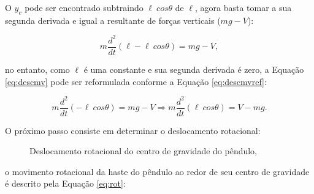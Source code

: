 \documentclass[12pt,           %
a4paper,                       %
openany,                       %
oneside,                       %
chapter=TITLE,                 %
english,                       %
spanish,                       %
brazil,                        %
sumario=tradicional]{abntex2}  %
\begin{document}
\begin{OnehalfSpace}
O $y_c$ pode ser encontrado subtraindo $\ell\:cos\theta$ de $\ell$, agora basta tomar a sua segunda derivada e igual a resultante de forças verticais ($mg-V$):

\begin{equation}
    m\frac{d^2}{dt}(\ell-\ell\:cos\theta) = mg - V,
    \label{eq:descmv}
\end{equation}

\noindent no entanto, como $\ell$ é uma constante e sua segunda derivada é zero, a Equação \ref{eq:descmv} pode ser reformulada conforme a Equação \ref{eq:descmvref}:

\begin{equation}
    m\frac{d^2}{dt}(-\ell\:cos\theta) = mg - V \Longrightarrow  m\frac{d^2}{dt}(\ell\:cos\theta) = V-mg.
    \label{eq:descmvref}
\end{equation}

O próximo passo consiste em determinar o deslocamento rotacional:

\begin{figure}[H]
    \centering
    \vspace*{-0.2cm}
    \caption{Deslocamento rotacional do centro de gravidade do pêndulo,}
    \label{fig:desr}
\end{figure}
\vspace*{-0.9cm}
{\raggedright {}}

\noindent o movimento rotacional da haste do pêndulo ao redor de seu centro de gravidade é descrito pela Equação \ref{eq:rot}:


\end{OnehalfSpace}
\end{document}
